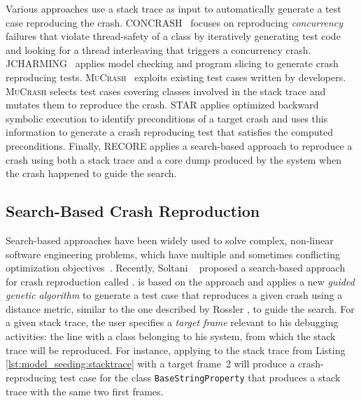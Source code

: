 Various approaches use a stack trace as input to automatically generate a test case reproducing the crash.
%
\textsc{CONCRASH}~\cite{BPT17concrash} focuses on reproducing \textit{concurrency} failures that violate thread-safety of a class by iteratively generating test code and looking for a thread interleaving that triggers a concurrency crash. %
%
\textsc{JCHARMING}~\cite{nayrolles2015jcharming,Nayrolles2017} applies model checking and program slicing to generate crash reproducing tests. %
%
\textsc{MuCrash}~\cite{Xuan2015} exploits existing test cases written by developers. \textsc{MuCrash} selects test cases covering classes involved in the stack trace and mutates them to reproduce the crash.
%
\textsc{STAR} \cite{Chen2015} applies optimized backward symbolic execution to identify preconditions of a target crash and uses this information to generate a crash reproducing test that satisfies the computed preconditions.
%
Finally, \textrm{RECORE} \cite{Rossler2013} applies a search-based approach to reproduce a crash using  both a stack trace and a core dump produced by the system when the crash happened to guide the search.


\subsection{Search-Based Crash Reproduction}

Search-based approaches have been widely used to solve complex, non-linear software engineering problems, which  have multiple and sometimes conflicting optimization objectives~\cite{Harman2012}. Recently, Soltani \etal~\cite{soltani2017} proposed a search-based approach for crash reproduction called \evocrash. \evocrash is based on the \evosuite approach \cite{fraser2012whole,Fraser2014b} and applies a new \textit{guided genetic algorithm} to generate a test case that reproduces a given crash using a distance metric, similar to the one described by Rossler \etal \cite{Rossler2013}, to guide the search.
%
For a given stack trace, the user specifies a \emph{target frame} relevant to his debugging activities: \ie the line with a class belonging to his system, from which the stack trace will be reproduced. For instance, applying \evocrash to the stack trace from Listing \ref{lst:model_seeding:stacktrace} with a target frame~2 will produce a crash-reproducing test case for the class \texttt{BaseStringProperty} that produces a stack trace with the same two first frames. 

